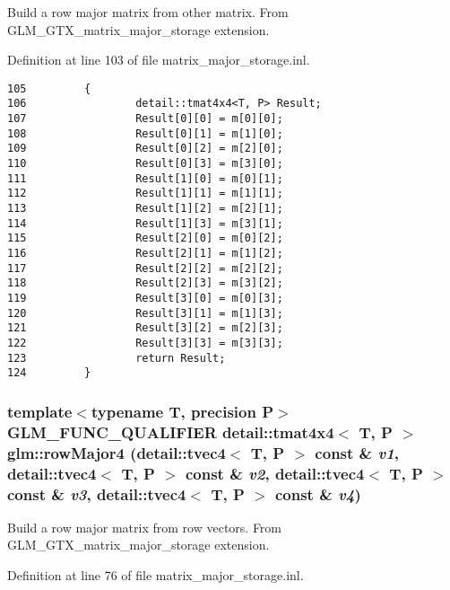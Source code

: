 Build a row major matrix from other matrix. From GLM\_\-GTX\_\-matrix\_\-major\_\-storage extension. 

Definition at line 103 of file matrix\_\-major\_\-storage.inl.

\begin{Code}\begin{verbatim}105         {
106                 detail::tmat4x4<T, P> Result;
107                 Result[0][0] = m[0][0];
108                 Result[0][1] = m[1][0];
109                 Result[0][2] = m[2][0];
110                 Result[0][3] = m[3][0];
111                 Result[1][0] = m[0][1];
112                 Result[1][1] = m[1][1];
113                 Result[1][2] = m[2][1];
114                 Result[1][3] = m[3][1];
115                 Result[2][0] = m[0][2];
116                 Result[2][1] = m[1][2];
117                 Result[2][2] = m[2][2];
118                 Result[2][3] = m[3][2];
119                 Result[3][0] = m[0][3];
120                 Result[3][1] = m[1][3];
121                 Result[3][2] = m[2][3];
122                 Result[3][3] = m[3][3];
123                 return Result;
124         }
\end{verbatim}
\end{Code}


\hypertarget{group__gtx__matrix__major__storage_g8d22c54daf5c593c1285c54d1439eead}{
\subsubsection[rowMajor4]{\setlength{\rightskip}{0pt plus 5cm}template$<$typename T, precision P$>$ GLM\_\-FUNC\_\-QUALIFIER detail::tmat4x4$<$ T, P $>$ glm::rowMajor4 (detail::tvec4$<$ T, P $>$ const \& {\em v1}, \/  detail::tvec4$<$ T, P $>$ const \& {\em v2}, \/  detail::tvec4$<$ T, P $>$ const \& {\em v3}, \/  detail::tvec4$<$ T, P $>$ const \& {\em v4})}}
\label{group__gtx__matrix__major__storage_g8d22c54daf5c593c1285c54d1439eead}


Build a row major matrix from row vectors. From GLM\_\-GTX\_\-matrix\_\-major\_\-storage extension. 

Definition at line 76 of file matrix\_\-major\_\-storage.inl.

